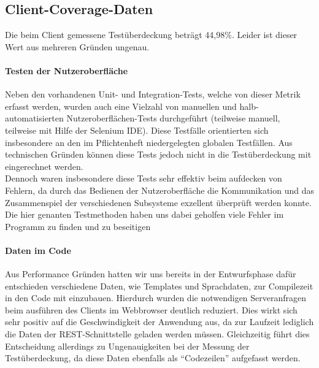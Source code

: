 \FloatBarrier
\subsection{Client-Coverage-Daten}
Die beim Client gemessene Testüberdeckung beträgt 44,98\%. Leider ist dieser Wert aus mehreren Gründen ungenau.
\paragraph{Testen der Nutzeroberfläche}
Neben den vorhandenen Unit- und Integration-Tests, welche von dieser Metrik erfasst werden, wurden auch eine Vielzahl von manuellen und halb-automatisierten Nutzeroberflächen-Tests durchgeführt (teilweise manuell, teilweise mit Hilfe der Selenium IDE). Diese Testfälle orientierten sich insbesondere an den im Pflichtenheft niedergelegten globalen Testfällen. Aus technischen Gründen können diese Tests jedoch nicht in die Testüberdeckung mit eingerechnet werden.\\
Dennoch waren insbesondere diese Tests sehr effektiv beim aufdecken von Fehlern, da durch das Bedienen der Nutzeroberfläche die Kommunikation und das Zusammenspiel der verschiedenen Subsysteme exzellent überprüft werden konnte. Die hier genanten Testmethoden haben uns dabei geholfen viele Fehler im Programm zu finden und zu beseitigen
\paragraph{Daten im Code}
Aus Performance Gründen hatten wir uns bereits in der Entwurfsphase dafür entschieden verschiedene Daten, wie Templates und Sprachdaten, zur Compilezeit in den Code mit einzubauen. Hierdurch wurden die notwendigen Serveranfragen beim ausführen des Clients im Webbrowser deutlich reduziert. Dies wirkt sich sehr positiv auf die Geschwindigkeit der Anwendung aus, da zur Laufzeit lediglich die Daten der REST-Schnittstelle geladen werden müssen. Gleichzeitig führt dies Entscheidung allerdings zu Ungenauigkeiten bei der Messung der Testüberdeckung, da diese Daten ebenfalls als \enquote{Codezeilen} aufgefasst werden.